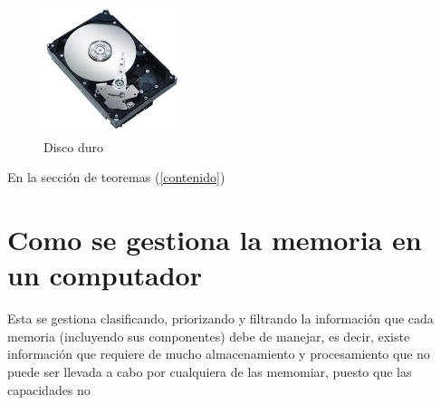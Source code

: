 \documentclass[12pt]{article}
\begin{document}
\begin{itemize}
\begin{figure}[h]
\includegraphics[width=4cm]{disco duro.jpg}
\centering
\caption{Disco duro}
\label{fig:disco duro}
\end{figure}

En la sección de teoremas (\ref{contenido})

\section{Como se gestiona la memoria en un computador}
Esta se gestiona clasificando, priorizando y filtrando la información que cada memoria (incluyendo sus componentes) debe de manejar, es decir, existe información que requiere de mucho almacenamiento y procesamiento que no puede ser llevada a cabo por cualquiera de las memomiar, puesto que las capacidades no  
\label{conclulsion}



\end{itemize}
\end{document}
